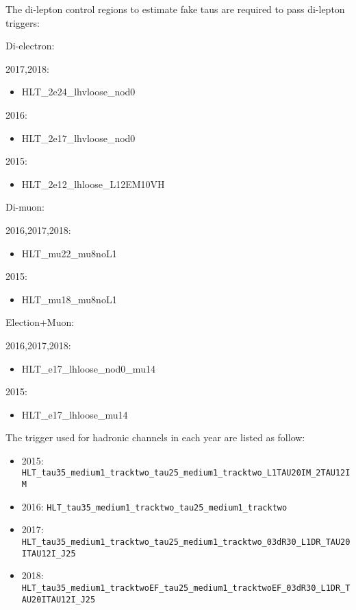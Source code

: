 The di-lepton control regions to estimate fake taus are required to pass di-lepton triggers:

Di-electron:

2017,2018:
\begin{itemize}
	\item HLT\_2e24\_lhvloose\_nod0
\end{itemize}
2016:
\begin{itemize}
	\item HLT\_2e17\_lhvloose\_nod0
\end{itemize}
2015:
\begin{itemize}
	\item HLT\_2e12\_lhloose\_L12EM10VH
\end{itemize}

Di-muon:

2016,2017,2018:
\begin{itemize}
	\item HLT\_mu22\_mu8noL1
\end{itemize}
2015:
\begin{itemize}
	\item HLT\_mu18\_mu8noL1
\end{itemize}

Election+Muon:

2016,2017,2018:
\begin{itemize}
	\item HLT\_e17\_lhloose\_nod0\_mu14
\end{itemize}
2015:
\begin{itemize}
	\item HLT\_e17\_lhloose\_mu14
\end{itemize}

The trigger used for hadronic channels in each year are listed as follow:
\begin{itemize}

\item 2015: \texttt{HLT\_tau35\_medium1\_tracktwo\_tau25\_medium1\_tracktwo\_L1TAU20IM\_2TAU12IM}
\item 2016: \texttt{HLT\_tau35\_medium1\_tracktwo\_tau25\_medium1\_tracktwo}
\item 2017: \texttt{HLT\_tau35\_medium1\_tracktwo\_tau25\_medium1\_tracktwo\_03dR30\_L1DR\_TAU20ITAU12I\_J25}
\item 2018: \texttt{HLT\_tau35\_medium1\_tracktwoEF\_tau25\_medium1\_tracktwoEF\_03dR30\_L1DR\_TAU20ITAU12I\_J25}

 \end{itemize}

